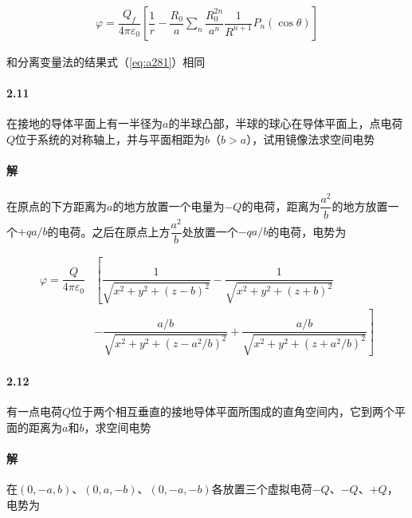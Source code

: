 \documentclass{article}
\begin{document}
\begin{equation*}
  \begin{aligned}
    \varphi = \dfrac{Q_f}{4\pi \varepsilon_0} \left[ \dfrac{1}{r} - \dfrac{R_0}{a} \sum_n \dfrac{R_0^{2n}}{a^n} \dfrac{1}{R^{n+1}} P_n \left( \cos \theta \right)  \right]
  \end{aligned}
\end{equation*}

和分离变量法的结果式（\ref{eq:a281}）相同

\paragraph{2.11}

在接地的导体平面上有一半径为$a$的半球凸部，半球的球心在导体平面上，点电荷$Q$位于系统的对称轴上，并与平面相距为$b$（$b>a$），试用镜像法求空间电势

\paragraph{解}

在原点的下方距离为$a$的地方放置一个电量为$-Q$的电荷，距离为$\dfrac{a^2}{b} $的地方放置一个$+qa/b$的电荷。之后在原点上方$\dfrac{a^2}{b} $处放置一个$-qa/b$的电荷，电势为

\begin{equation*}
  \begin{aligned}
    \varphi = \dfrac{Q}{4\pi \varepsilon_0} & \left[ \dfrac{1}{\sqrt{x^2 + y^2 + \left( z-b \right)^2}} - \dfrac{1}{\sqrt{x^2 + y^2 + \left( z + b \right)^2}} \right. \\
     & \left. - \dfrac{a/b}{\sqrt{x^2 + y^2 + \left( z - a^2/b \right)^2}} + \dfrac{a/b}{\sqrt{x^2 + y^2 + \left( z + a^2/b \right)^2}}   \right]
  \end{aligned}
\end{equation*}

\paragraph{2.12}

有一点电荷$Q$位于两个相互垂直的接地导体平面所围成的直角空间内，它到两个平面的距离为$a$和$b$，求空间电势

\paragraph{解}

在$(0,-a,b)$、$(0,a,-b)$、$(0,-a,-b)$各放置三个虚拟电荷$-Q$、$-Q$、$+Q$，电势为
\end{document}
